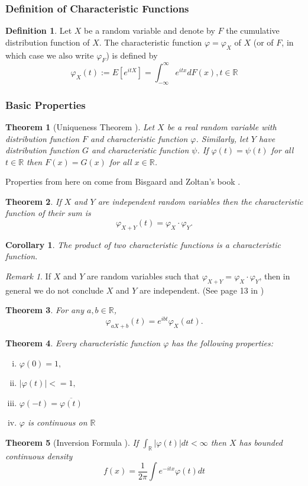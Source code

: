 \documentclass{article}
\theoremstyle{definition}
\newtheorem{definition}{Definition}[section]
\theoremstyle{plain}
\newtheorem{theorem}{Theorem}[section]
\newtheorem{corollary}{Corollary}[theorem]
\theoremstyle{remark}
\newtheorem*{remark}{Remark}
\newcommand{\reals}{\mathbb{R}}
\begin{document}
\subsubsection{Definition of Characteristic Functions}
\begin{definition}
	Let $X$ be a random variable and denote by $F$ the cumulative distribution function of $X$. The characteristic function $\varphi=\varphi_X$ of $X$ (or of $F$, in which case we also write $\varphi_F$) is defined by \textnormal{\cite{cfms}}
	$$\varphi_X(t):=E[e^{itX}]=\int_{-\infty}^\infty e^{itx}dF(x), t\in\reals$$
\end{definition}
\subsubsection{Basic Properties} 
\begin{theorem}[Uniqueness Theorem \cite{uChicago}]
	Let $X$ be a real random variable with distribution function
	$F$ and characteristic function $\varphi$. Similarly, let $Y$ have distribution
	function $G$ and characteristic function $\psi$. If $\varphi(t) = \psi(t)$ for all $t\in\reals$
	then $F(x) = G(x)$ for all $x \in\reals$.
\end{theorem}
\noindent Properties from here on come from Bisgaard and Zoltan's book \cite{cfms}.
\begin{theorem}
If $X$ and $Y$ are independent random variables then the characteristic function of their sum is $$\varphi_{X+Y}(t) = \varphi_{X}\cdot\varphi_{Y}.$$
\end{theorem}
\begin{corollary}
The product of two characteristic functions is a characteristic function.
\end{corollary}
\begin{remark}
	If $X$ and $Y$ are random variables such that $\varphi_{X+Y} = \varphi_X\cdot\varphi_Y $, then in general we do not conclude $X$ and $Y$ are independent. (See page 13 in \cite{cfms})
\end{remark} 
\begin{theorem}
For any $a,b \in \reals$, $$\varphi_{aX+b}(t)=e^{ibt}\varphi_X(at).$$
\end{theorem}
\begin{theorem}
Every characteristic function $\varphi$ has the following properties:
\begin{enumerate}[(i)]
	\item $\varphi(0)=1,$
	\item $|\varphi(t)|<=1,$
	\item $\varphi(-t)=\overline{\varphi(t)}$
	\item $\varphi$ is continuous on $\reals$
\end{enumerate}
\end{theorem}
\begin{theorem}[Inversion Formula \cite{pte}]
	If $\int_\reals |\varphi(t)| dt < \infty$ then $X$ has bounded continuous density
	$$
	f(x) = \frac1{2\pi} \int e^{-itx}\varphi(t)dt
	$$

\end{theorem}
\end{document}
